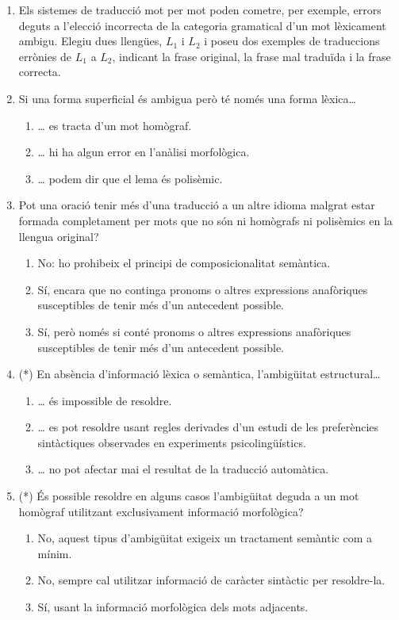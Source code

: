 \begin{enumerate}
\item Els sistemes de traducció mot per mot poden cometre, per
  exemple, errors deguts a l'elecció incorrecta de la categoria
  gramatical d'un mot lèxicament ambigu. Elegiu dues llengües, $L_1$ i
  $L_2$ i poseu dos exemples de traduccions errònies de $L_1$ a $L_2$,
  indicant la frase original, la frase mal traduïda i la frase
  correcta.

\item Si una forma superficial és ambigua però té només una forma
  lèxica{\ldots}   
  \begin{enumerate}
  \item {\ldots} es tracta d'un mot homògraf.
  \item {\ldots} hi ha algun error en l'anàlisi morfològica.
  \item {\ldots} podem dir que el lema és polisèmic.
  \end{enumerate}

\item Pot una oració tenir més d'una traducció a un altre idioma
  malgrat estar formada completament per mots que no són ni homògrafs
  ni polisèmics en la llengua original?
  \begin{enumerate}
  \item No: ho prohibeix el principi de composicionalitat semàntica.
  \item Sí, encara que no continga pronoms o altres expressions
    anafòriques susceptibles de tenir més d'un antecedent possible.
  \item Sí, però només si conté pronoms o altres expressions
    anafòriques susceptibles de tenir més d'un antecedent possible.
  \end{enumerate}

\item (*) En absència d'informació lèxica o semàntica, l'ambigüitat
  estructural{\ldots}
  \begin{enumerate}
  \item {\ldots} és impossible de resoldre.
  \item {\ldots} es pot resoldre usant regles derivades d'un estudi de
    les preferències sintàctiques observades en experiments
    psicolingüístics.
  \item {\ldots} no pot afectar mai el resultat de la traducció
    automàtica.
  \end{enumerate}

\item (*) És possible resoldre en alguns casos l'ambigüitat deguda a un
  mot homògraf utilitzant exclusivament informació morfològica?
  \begin{enumerate}
  \item No, aquest tipus d'ambigüitat exigeix un tractament semàntic
    com a mínim.
  \item No, sempre cal utilitzar informació de caràcter sintàctic per
    resoldre-la.
  \item Sí, usant la informació morfològica dels mots adjacents.
  \end{enumerate}


\end{enumerate}
